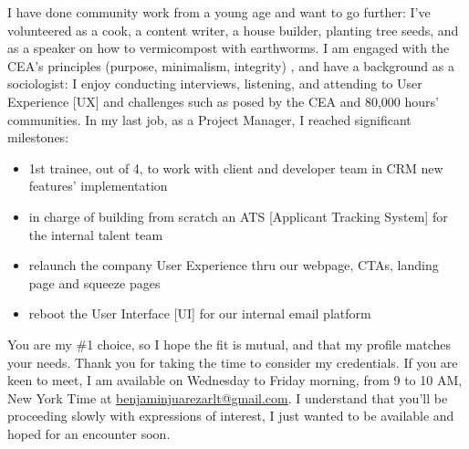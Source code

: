 I have done community work from a young age and want to go further: 
I've volunteered as 
a cook, a content writer, a house builder, planting tree seeds, 
and as a speaker on how to vermicompost with earthworms.
%
I am engaged with the CEA's %
principles %
(purpose, minimalism, integrity)%
,
and have a background as a sociologist: 
I enjoy 
conducting interviews, 
listening, %
and attending to User Experience [UX]
and challenges such as posed by the CEA and 80,000 hours' communities. 
% 
In my last job, as a Project Manager, I 
reached significant %
milestones: 
\begin{itemize}
 \item 
 1st trainee, out of 4, to %
 work %
 with client and developer team in CRM new features' implementation
 \item %
 in charge of building from scratch an ATS [Applicant Tracking System] %
 for the internal talent team 
 \item relaunch the company User Experience thru our webpage, CTAs, landing page and squeeze pages
 \item reboot the User Interface [UI] for our internal email platform
\end{itemize}

You are my \#1 choice, so
I hope the fit is mutual, 
and that my profile matches your needs.
Thank you for taking the time to consider my credentials.
If you are keen to meet, I am available on Wednesday to Friday morning, from 9 to 10 AM, New York Time 
at
\href{benjaminjuarezarlt@gmail.com}{benjaminjuarezarlt@gmail.com}. I understand that you'll be proceeding slowly with expressions of interest, I just wanted to be available and hoped for an encounter soon.

